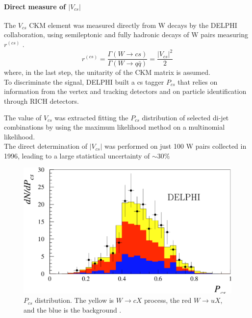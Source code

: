 \vspace{-0.85cm}
\paragraph*{Direct measure of $|V_{cs}|$}
The $V_{cs}$ CKM element was measured directly from W decays by the DELPHI collaboration, using semileptonic and fully hadronic decays of W pairs measuring $r^{(cs)}$ \cite{Abreu1998MeasurementLEP2}.
\vspace{-0.5cm}
\begin{equation}
    r^{(cs)}=\frac{\Gamma(W\to cs)}{\Gamma(W\to q\bar{q})}=\frac{|V_{cs}|^2}{2}
\end{equation}
where, in the last step, the unitarity of the CKM matrix is assumed.\\
To discriminate the signal, DELPHI built a cs tagger $P_{cs}$ that relies on information from the vertex and tracking detectors and on particle identification through RICH detectors.\\
\begin{minipage}{\linewidth}
\begin{minipage}{0.4\linewidth}
    \vspace{-1cm}
    The value of $V_{cs}$ was extracted fitting the $P_{cs}$ distribution of selected di-jet combinations by using the maximum likelihood method on a multinomial likelihood.
    \\
    The direct determination of $|V_{cs}|$ was performed on just 100 W pairs collected in 1996, leading to a large statistical uncertainty of $\sim 30\%$\\
\end{minipage}
\hfill
\begin{minipage}{0.58\linewidth}
    \begin{figure}[H]
        \centering
        \includegraphics[width=\linewidth]{fig//chap02-theory/delphi.png}
        \caption{$P_{cs}$ distribution. The yellow is $W\to cX$ process, the red $W\to uX$, and the blue is the background \cite{Abreu1998MeasurementLEP2}.}
        \label{fig:enter-label}
    \end{figure}
\end{minipage}
\end{minipage}
